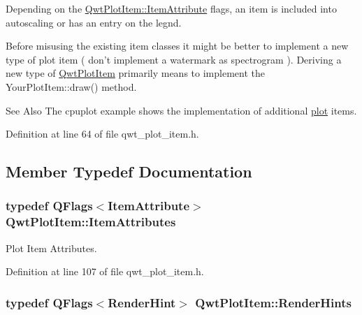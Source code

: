 Depending on the \hyperlink{class_qwt_plot_item_ae0fabcdd35f4818ce5bbe019b0eed062}{Qwt\-Plot\-Item\-::\-Item\-Attribute} flags, an item is included into autoscaling or has an entry on the legnd.

Before misusing the existing item classes it might be better to implement a new type of plot item ( don't implement a watermark as spectrogram ). Deriving a new type of \hyperlink{class_qwt_plot_item}{Qwt\-Plot\-Item} primarily means to implement the Your\-Plot\-Item\-::draw() method.

\begin{DoxySeeAlso}{See Also}
The cpuplot example shows the implementation of additional \hyperlink{class_qwt_plot_item_a4c99653a14a49ad94d466168d06e97b9}{plot} items. 
\end{DoxySeeAlso}


Definition at line 64 of file qwt\-\_\-plot\-\_\-item.\-h.



\subsection{Member Typedef Documentation}
\hypertarget{class_qwt_plot_item_af356dc13c7838c7437334e199a356764}{
\subsubsection[{Item\-Attributes}]{\setlength{\rightskip}{0pt plus 5cm}typedef Q\-Flags$<${\bf Item\-Attribute}$>$ {\bf Qwt\-Plot\-Item\-::\-Item\-Attributes}}}\label{class_qwt_plot_item_af356dc13c7838c7437334e199a356764}


Plot Item Attributes. 



Definition at line 107 of file qwt\-\_\-plot\-\_\-item.\-h.

\hypertarget{class_qwt_plot_item_a40cf900701d3a68948b00316689616d1}{
\subsubsection[{Render\-Hints}]{\setlength{\rightskip}{0pt plus 5cm}typedef Q\-Flags$<${\bf Render\-Hint}$>$ {\bf Qwt\-Plot\-Item\-::\-Render\-Hints}}}\label{class_qwt_plot_item_a40cf900701d3a68948b00316689616d1}



